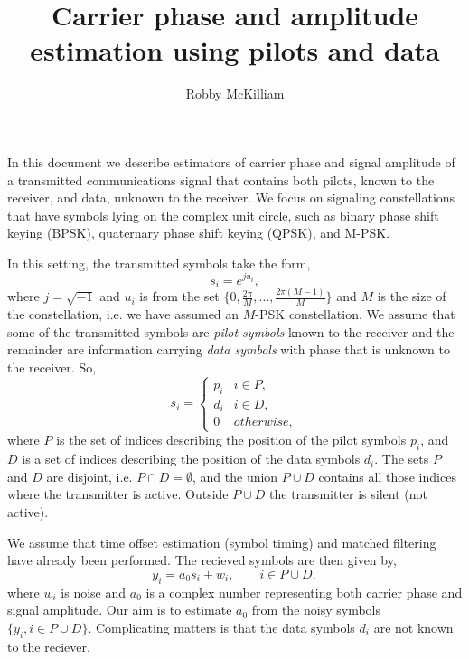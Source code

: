 \documentclass[a4paper,10pt]{article}
\title{Carrier phase and amplitude estimation using pilots and data}
\author{Robby McKilliam}
\begin{document}
\maketitle

In this document we describe estimators of carrier phase and signal amplitude of a transmitted communications signal that contains both pilots, known to the receiver, and data, unknown to the receiver.  We focus on signaling constellations that have symbols lying on the complex unit circle, such as binary phase shift keying (BPSK), quaternary phase shift keying (QPSK), and M-PSK.  

In this setting, the transmitted symbols take the form,
\[
s_i = e^{j u_i},
\]
where $j = \sqrt{-1}$ and $u_i$ is from the set $\{0, \tfrac{2\pi}{M}, \dots, \tfrac{2\pi(M-1)}{M}\}$ and $M$ is the size of the constellation, i.e. we have assumed an $M$-PSK constellation.  We assume that some of the transmitted symbols are \emph{pilot symbols} known to the receiver and the remainder are information carrying \emph{data symbols} with phase that is unknown to the receiver.  So,
\[
s_i = \begin{cases}
p_i & i \in P, \\
d_i & i \in D, \\
0 & otherwise,
\end{cases}
\]
where $P$ is the set of indices describing the position of the pilot symbols $p_i$, and $D$ is a set of indices describing the position of the data symbols $d_i$.  The sets $P$ and $D$ are disjoint, i.e. $P \cap D = \emptyset$, and the union $P \cup D$ contains all those indices where the transmitter is active.  Outside $P \cup D$ the transmitter is silent (not active).  

We assume that time offset estimation (symbol timing) and matched filtering have already been performed.  The recieved symbols are then given by,
\begin{equation}\label{eq:sigmod}
y_i = a_0 s_i + w_i, \qquad i \in P \cup D,
\end{equation}
where $w_i$ is noise and $a_0$ is a complex number representing both carrier phase and signal amplitude.  Our aim is to estimate $a_0$ from the noisy symbols $\{ y_i, i \in P \cup D \}$.  Complicating matters is that the data symbols $d_i$ are not known to the reciever.  
\end{document}
